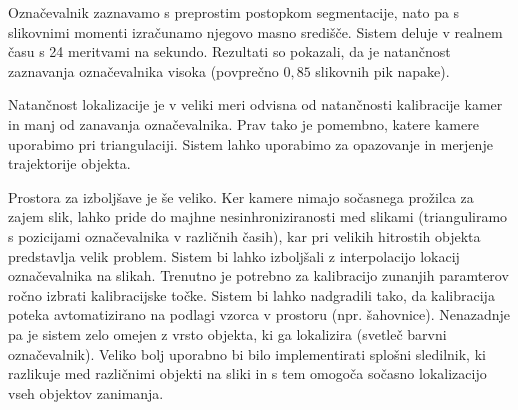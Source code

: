 \documentclass[a4paper, 12pt]{book}
\begin{document}
Označevalnik zaznavamo s preprostim postopkom segmentacije, nato pa s slikovnimi momenti izračunamo njegovo masno središče. Sistem deluje v realnem času s 24 meritvami na sekundo. Rezultati so pokazali, da je natančnost zaznavanja označevalnika visoka (povprečno $0,85$ slikovnih pik napake).

Natančnost lokalizacije je v veliki meri odvisna od natančnosti kalibracije kamer in manj od zanavanja označevalnika. Prav tako je pomembno, katere kamere uporabimo pri triangulaciji. Sistem lahko uporabimo za opazovanje in merjenje trajektorije objekta.

Prostora za izboljšave je še veliko. Ker kamere nimajo sočasnega prožilca za zajem slik, lahko pride do majhne nesinhroniziranosti med slikami (trianguliramo s pozicijami označevalnika v različnih časih), kar pri velikih hitrostih objekta predstavlja velik problem. Sistem bi lahko izboljšali z interpolacijo lokacij označevalnika na slikah. Trenutno je potrebno za kalibracijo zunanjih paramterov ročno izbrati kalibracijske točke. Sistem bi lahko nadgradili tako, da kalibracija poteka avtomatizirano na podlagi vzorca v prostoru (npr. šahovnice). Nenazadnje pa je sistem zelo omejen z vrsto objekta, ki ga lokalizira (svetleč barvni označevalnik). Veliko bolj uporabno bi bilo implementirati splošni sledilnik, ki razlikuje med različnimi objekti na sliki in s tem omogoča sočasno lokalizacijo vseh objektov zanimanja.



{}

\end{document}
